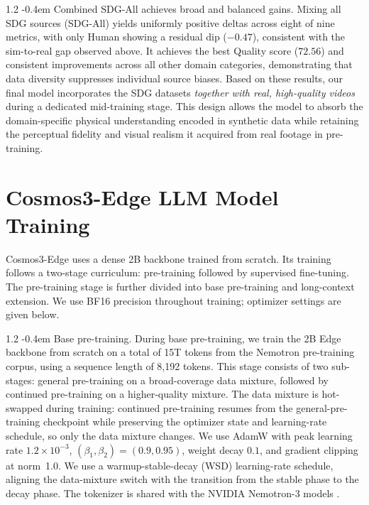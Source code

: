 \documentclass{llmxive}
\makeatletter
\providecommand{\paragraph}{  \@startsection{paragraph}{4}{\z@}    {1\baselineskip \@plus .2\baselineskip}    {-0.4em}    {\normalfont\normalsize\bfseries}}
\makeatother
\begin{document}
\paragraph{Combined SDG-All achieves broad and balanced gains.}
Mixing all SDG sources (SDG-All) yields uniformly positive deltas across eight
of nine metrics, with only Human showing a residual dip ($-0.47$), consistent
with the sim-to-real gap observed above. It achieves the best Quality score
($72.56$) and consistent improvements across all other domain categories,
demonstrating that data diversity suppresses individual source biases. Based on
these results, our final model incorporates the SDG datasets \emph{together with real, high-quality videos} during a dedicated mid-training stage. This design allows the model to absorb the domain-specific physical
understanding encoded in synthetic data while retaining the perceptual fidelity
and visual realism it acquired from real footage in pre-training.

\section{Cosmos3-Edge LLM Model Training}
\label{app:training_edge}

Cosmos3-Edge uses a dense 2B backbone trained from scratch. Its training follows a two-stage curriculum: pre-training followed by supervised fine-tuning. The pre-training stage is further divided into base pre-training and long-context extension. We use BF16 precision throughout training; optimizer settings are given below.

\paragraph{Base pre-training.}
During base pre-training, we train the 2B Edge backbone from scratch on a total of 15T tokens from the Nemotron pre-training corpus, using a sequence length of 8,192 tokens. This stage consists of two sub-stages: general pre-training on a broad-coverage data mixture, followed by continued pre-training on a higher-quality mixture. The data mixture is hot-swapped during training: continued pre-training resumes from the general-pre-training checkpoint while preserving the optimizer state and learning-rate schedule, so only the data mixture changes. We use AdamW with peak learning rate $1.2\times 10^{-3}$, $(\beta_1,\beta_2)=(0.9,0.95)$, weight decay $0.1$, and gradient clipping at norm~1.0. We use a warmup-stable-decay (WSD) learning-rate schedule, aligning the data-mixture switch with the transition from the stable phase to the decay phase. The tokenizer is shared with the NVIDIA Nemotron-3 models \citep{nemotron3-family}.
\end{document}
